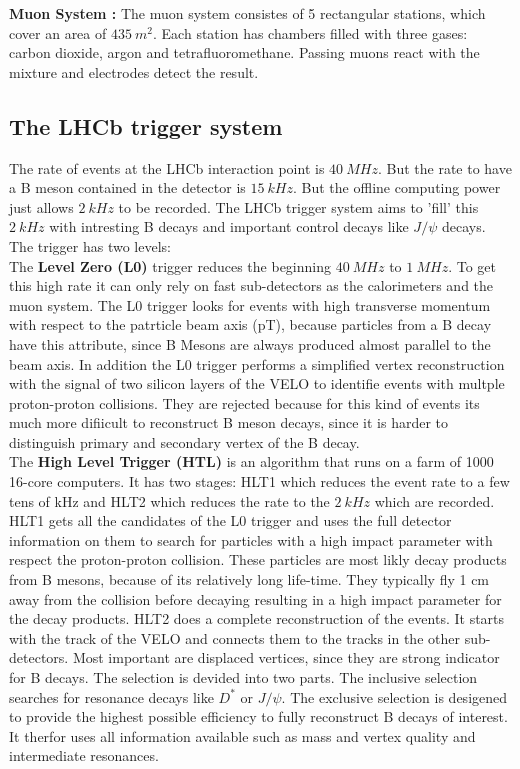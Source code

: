 \documentclass[english]{uzhpub}
\begin{document}
\textbf{Muon System \cite{bib:muonSys} :} The muon system consistes of 5 rectangular stations, which cover an area of $\SI{435}{m^2}$. Each station has chambers filled with three gases: carbon dioxide, argon and tetrafluoromethane. Passing muons react with the mixture and electrodes detect the result.


\subsection{The LHCb trigger system}
The rate of events at the LHCb interaction point is $\SI{40}{MHz}$. But the rate to have a B meson contained in the detector is $\SI{15}{kHz}$. But the offline computing power just allows $\SI{2}{kHz}$ to be recorded. The LHCb trigger system aims to 'fill' this $\SI{2}{kHz}$ with intresting B decays and important control decays like $J/ \psi$ decays. The trigger has two levels: \\
The \textbf{Level Zero (L0)} trigger reduces the beginning $\SI{40}{MHz}$ to $\SI{1}{MHz}$. To get this high rate it can only rely on fast sub-detectors as the calorimeters and the muon system. The L0 trigger looks for events with high transverse momentum with respect to the patrticle beam axis (pT), because particles from a B decay have this attribute, since B Mesons are always produced almost parallel to the beam axis.
In addition the L0 trigger performs a simplified vertex reconstruction with the signal of two silicon layers of the VELO to identifie events with multple proton-proton collisions. They are rejected because for this kind of events its much more difiicult to reconstruct B meson decays, since it is harder to distinguish primary and secondary vertex of the B decay. \\
The \textbf{High Level Trigger (HTL)} is an algorithm that runs on a farm of 1000 16-core computers. It has two stages: HLT1 which reduces the event rate to a few tens of kHz and HLT2 which reduces the rate to the $\SI{2}{kHz}$ which are recorded. HLT1 gets all the candidates of the L0 trigger and uses the full detector information on them to search for particles with a high impact parameter with respect the proton-proton collision. These particles are most likly decay products from B mesons, because of its relatively long life-time. They typically fly 1 cm away from the collision before decaying resulting in a high impact parameter for the decay products. HLT2 does a complete reconstruction of the events. It starts with the track of the VELO and connects them to the tracks in the other sub-detectors. Most important are displaced vertices, since they are strong indicator for B decays. The selection is devided into two parts. The inclusive selection searches for resonance decays like $D^*$ or $J/ \psi$. The exclusive selection is desigened to provide the highest possible efficiency to fully reconstruct B decays of interest. It therfor uses all information available such as mass and vertex quality and intermediate resonances.
\end{document}
